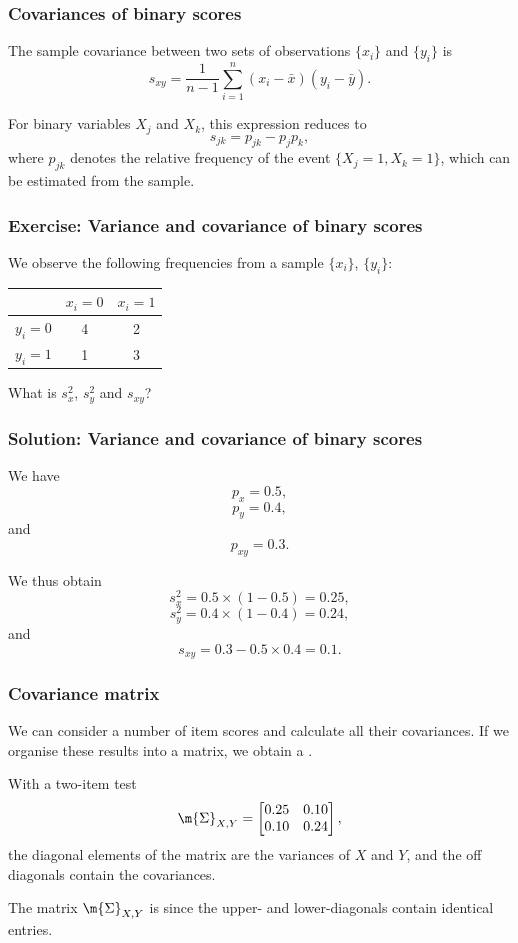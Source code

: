 \documentclass[compress]{beamer}\usepackage[]{graphicx}\usepackage[]{xcolor}
\begin{document}
\begin{frame}[fragile]
  \frametitle{Covariances of binary scores}
    The sample covariance between two sets of observations $\{x_i\}$ and $\{y_i\}$ is
      \[ s_{xy} = \frac{1}{n - 1} \sum_{i=1}^n(x_i - \bar{x})(y_i - \bar{y}). \]

    For binary variables $X_j$ and $X_k$, this expression reduces to 
      \[ s_{jk} = p_{jk} - p_jp_k, \]
    where $p_{jk}$ denotes the relative frequency of the event $\{X_j = 1, X_k = 1\}$, which can be estimated from the sample.
\end{frame}


\begin{frame}[fragile]
    \frametitle{Exercise: Variance and covariance of binary scores}
      We observe the following frequencies from a sample $\{x_i\}$, $\{y_i\}$:

      \begin{center}
        \begin{tabular}{|c|c|c|}
          \hline
          & $x_i = 0$ & $x_i = 1$\\
          \hline
          $y_i = 0$ & 4 & 2 \\
          \hline
          $y_i = 1$ & 1 & 3 \\
          \hline
        \end{tabular}
      \end{center}

    What is $s_x^2$, $s_y^2$ and $s_{xy}$?
\end{frame}

\begin{frame}[fragile]
  \frametitle{Solution: Variance and covariance of binary scores}
    We have
      \[ p_x = 0.5, \]
      \[ p_y = 0.4, \]
    and
      \[ p_{xy} = 0.3. \]

    We thus obtain
    \[ s_x^2 = 0.5 \times (1 - 0.5) = 0.25, \]
    \[ s_y^2 = 0.4 \times (1 - 0.4) = 0.24, \]
    and
    \[ s_{xy} = 0.3 - 0.5 \times 0.4 = 0.1. \]
\end{frame}


\begin{frame}[fragile]
  \frametitle{Covariance matrix}
    We can consider a number of item scores and calculate all their covariances. If we organise these results into a matrix, we obtain a .

    With a two-item test
      \begin{equation*}
        \m{\Sigma}_{X,Y} =
          \begin{bmatrix}
            0.25  &0.10\\
            0.10  &0.24
          \end{bmatrix},
    \end{equation*}
    the diagonal elements of the matrix are the variances of $X$ and $Y$, and the off diagonals contain the covariances.

    The matrix $\m{\Sigma}_{X,Y}$ is  since the upper- and lower-diagonals contain identical entries.
\end{frame}
\end{document}
